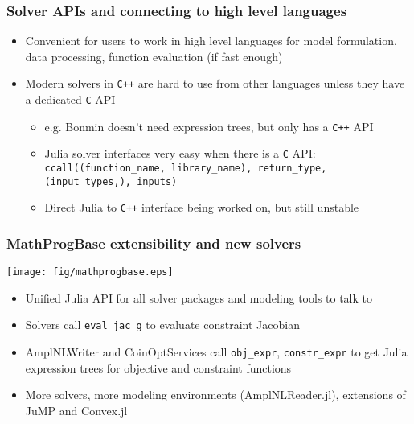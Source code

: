 \documentclass[compressed,dvips,letter]{beamer}
\begin{document}
\begin{frame}[fragile]\frametitle{Solver APIs and connecting to high level languages}
\begin{itemize}
\item Convenient for users to work in high level languages for model formulation, data processing, function evaluation (if fast enough)
\item Modern solvers in \texttt{C++} are hard to use from other languages unless they have a dedicated \texttt{C} API
\begin{itemize}
\item e.g. Bonmin doesn't need expression trees, but only has a \texttt{C++} API
\item Julia solver interfaces very easy when there is a \texttt{C} API: \texttt{ccall((function\_name, library\_name), return\_type, (input\_types,), inputs)}
\item Direct Julia to \texttt{C++} interface being worked on, but still unstable
\end{itemize}
\end{itemize}
\end{frame}
%
%


\begin{frame}[fragile]\frametitle{MathProgBase extensibility and new solvers}
\begin{center}
\texttt{[image: fig/mathprogbase.eps]}
\end{center}
\vspace{-15pt}
\begin{itemize}
\item Unified Julia API for all solver packages and modeling tools to talk to
\item Solvers call \texttt{eval\_jac\_g} to evaluate constraint Jacobian
\item AmplNLWriter and CoinOptServices call \texttt{obj\_expr}, \texttt{constr\_expr} to get Julia expression trees for objective and constraint functions
\item More solvers, more modeling environments (AmplNLReader.jl), extensions of JuMP and Convex.jl
\end{itemize}
\end{frame}
%
%
\end{document}
